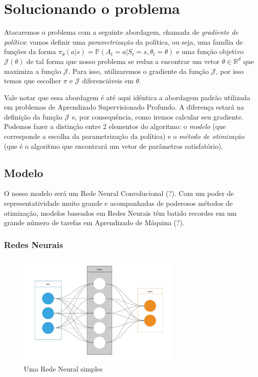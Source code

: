 \chapter{Solucionando o problema}
\label{cap:solucao}

Atacaremos o problema com a seguinte abordagem, chamada de \textit{gradiente de política}: vamos definir uma \textit{parametrização} da política, ou seja, uma família de funções da forma $\pi_{\theta}(a | s) = \mathbb{P}(A_t = a | S_t = s, \theta_t = \theta)$ e uma função objetivo $\mathcal{J}(\theta)$ de tal forma que nosso problema se reduz a encontrar um vetor $\theta \in \mathbb{R}^d$ que maximiza a função $\mathcal{J}$. Para isso, utilizaremos o gradiente da função $\mathcal{J}$, por isso temos que escolher $\pi$ e $\mathcal{J}$ diferenciáveis em $\theta$.

Vale notar que essa abordagem é até aqui idêntica a abordagem padrão utilizada em problemas de Aprendizado Supervisionado Profundo. A diferença estará na definição da função $\mathcal{J}$ e, por consequência, como iremos calcular seu gradiente. Podemos fazer a distinção entre 2 elementos do algoritmo: o \textit{modelo} (que corresponde a escolha da parametrização da política) e o \textit{método de otimização} (que é o algoritmo que encontrará um vetor de parâmetros satisfatório).

\section{Modelo}

O nosso modelo será um Rede Neural Convolucional (?). Com um poder de representatividade muito grande e acompanhadas de poderosos métodos de otimização, modelos baseados em Redes Neurais têm batido recordes em um grande número de tarefas em Aprendizado de Máquina (?).

\subsection{Redes Neurais}

\begin{figure}[h!]
\centering
    \includegraphics[width=8cm]{figuras/nn}
    \caption{Uma Rede Neural simples}
    \label{fig:nn}
\end{figure}

